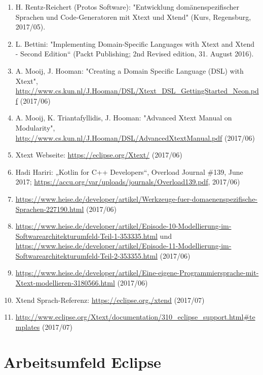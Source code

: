 \documentclass[]{article}
\begin{document}
\begin{enumerate}
\def\labelenumi{\arabic{enumi}.}
\item
  \protect\hypertarget{anchor-1}{}{}H. Rentz-Reichert (Protos Software):
  "Entwicklung domänenspezifischer Sprachen und Code-Generatoren mit
  Xtext und Xtend" (Kurs, Regensburg, 2017/05).
\item
  \protect\hypertarget{anchor-2}{}{}L. Bettini: "Implementing
  Domain-Specific Languages with Xtext and Xtend - Second Edition``
  (Packt Publishing; 2nd Revised edition, 31. August 2016).
\item
  \protect\hypertarget{anchor-3}{}{}A. Mooij, J. Hooman: "Creating a
  Domain Specific Language (DSL) with Xtext",
  \url{http://www.cs.kun.nl/J.Hooman/DSL/Xtext_DSL_GettingStarted_Neon.pdf}
  (2017/06)
\item
  \protect\hypertarget{anchor-4}{}{}A. Mooij, K. Triantafyllidis, J.
  Hooman: "Advanced Xtext Manual on Modularity",
  \url{http://www.cs.kun.nl/J.Hooman/DSL/AdvancedXtextManual.pdf}
  (2017/06)
\item
  \protect\hypertarget{anchor-5}{}{}Xtext Webseite:
  \url{https://eclipse.org/Xtext/} (2017/06)
\item
  \protect\hypertarget{anchor-11}{}{}Hadi Hariri: „Kotlin for C++
  Developers``, Overload Journal \#139, June 2017;
  \url{https://accu.org/var/uploads/journals/Overload139.pdf}, 2017/06)
\item
  \protect\hypertarget{anchor-7}{}{}\url{https://www.heise.de/developer/artikel/Werkzeuge-fuer-domaenenspezifische-Sprachen-227190.html}
  (2017/06)
\item
  \protect\hypertarget{anchor-8}{}{}\url{https://www.heise.de/developer/artikel/Episode-10-Modellierung-im-Softwarearchitekturumfeld-Teil-1-353335.html}
  und
  \url{https://www.heise.de/developer/artikel/Episode-11-Modellierung-im-Softwarearchitekturumfeld-Teil-2-353355.html}
  (2017/06)
\item
  \protect\hypertarget{anchor-6}{}{}\url{https://www.heise.de/developer/artikel/Eine-eigene-Programmiersprache-mit-Xtext-modellieren-3180566.html}
  (2017/06)
\item
  \protect\hypertarget{anchor-12}{}{}Xtend Sprach-Referenz:
  \url{https://eclipse.org./xtend} (2017/07)
\item
  \protect\hypertarget{anchor-13}{}{}\url{http://www.eclipse.org/Xtext/documentation/310_eclipse_support.html\#templates}
  (2017/07)
\end{enumerate}

\section[Arbeitsumfeld
Eclipse]{\texorpdfstring{\protect\hypertarget{anchor-14}{}{}Arbeitsumfeld
Eclipse}{Arbeitsumfeld Eclipse}}\label{arbeitsumfeld-eclipse}
\end{document}
